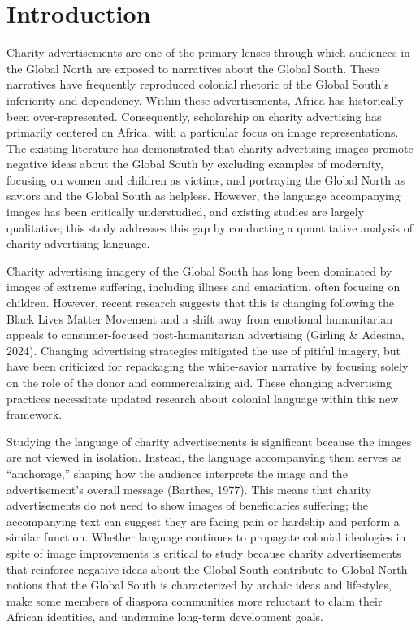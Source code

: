\chapter{Introduction}
Charity advertisements are one of the primary lenses through which audiences in the Global North are exposed to narratives about the Global South. These narratives have frequently reproduced colonial rhetoric of the Global South’s inferiority and dependency. Within these advertisements, Africa has historically been over-represented. Consequently, scholarship on charity advertising has primarily centered on Africa, with a particular focus on image representations. The existing literature has demonstrated that charity advertising images promote negative ideas about the Global South by excluding examples of modernity, focusing on women and children as victims, and portraying the Global North as saviors and the Global South as helpless. However, the language accompanying images has been critically understudied, and existing studies are largely qualitative; this study addresses this gap by conducting a quantitative analysis of charity advertising language.

Charity advertising imagery of the Global South has long been dominated by images of extreme suffering, including illness and emaciation, often focusing on children. However, recent research suggests that this is changing following the Black Lives Matter Movement and a shift away from emotional humanitarian appeals to consumer-focused post-humanitarian advertising (Girling \& Adesina, 2024). Changing advertising strategies mitigated the use of pitiful imagery, but have been criticized for repackaging the white-savior narrative by focusing solely on the role of the donor and commercializing aid. These changing advertising practices necessitate updated research about colonial language within this new framework.

Studying the language of charity advertisements is significant because the images are not viewed in isolation. Instead, the language accompanying them serves as “anchorage,” shaping how the audience interprets the image and the advertisement’s overall message (Barthes, 1977). This means that charity advertisements do not need to show images of beneficiaries suffering; the accompanying text can suggest they are facing pain or hardship and perform a similar function. Whether language continues to propagate colonial ideologies in spite of image improvements is critical to study because charity advertisements that reinforce negative ideas about the Global South contribute to Global North notions that the Global South is characterized by archaic ideas and lifestyles, make some members of diaspora communities more reluctant to claim their African identities, and undermine long-term development goals.

